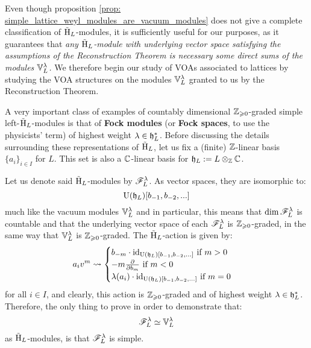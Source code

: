             Even though proposition \ref{prop: simple_lattice_weyl_modules_are_vacuum_modules} does not give a complete classification of $\tilde{\mathrm{H}}_L$-modules, it is sufficiently useful for our purposes, as it guarantees that \textit{any $\tilde{\mathrm{H}}_L$-module with underlying vector space satisfying the assumptions of the Reconstruction Theorem is necessary some direct sums of the modules $\mathbb{V}_L^{\lambda}$.} We therefore begin our study of VOAs associated to lattices by studying the VOA structures on the modules $\mathbb{V}_L^{\lambda}$ granted to us by the Reconstruction Theorem. 
            \begin{example} \label{example: bosonic_fock_modules}
                A very important class of examples of countably dimensional $\mathbb{Z}_{\geqslant 0}$-graded simple left-$\tilde{\mathrm{H}}_L$-modules is that of \textbf{Fock modules} (or \textbf{Fock spaces}, to use the physicists' term) of highest weight $\lambda \in \mathfrak{h}_L^*$. Before discussing the details surrounding these representations of $\tilde{\mathrm{H}}_L$, let us fix a (finite) $\mathbb{Z}$-linear basis $\{a_i\}_{i \in I}$ for $L$. This set is also a $\mathbb{C}$-linear basis for $\h_L := L \tensor_{\Z} \bbC$.
                
                Let us denote said $\tilde{\mathrm{H}}_L$-modules by $\mathscr{F}_L^{\lambda}$. As vector spaces, they are isomorphic to:
                    $$\mathrm{U}(\mathfrak{h}_L)[b_{-1}, b_{-2}, ...]$$
                much like the vacuum modules $\mathbb{V}_L^{\lambda}$ and in particular, this means that $\dim \mathscr{F}_L^{\lambda}$ is countable and that the underlying vector space of each $\mathscr{F}_L^{\lambda}$ is $\mathbb{Z}_{\geqslant 0}$-graded, in the same way that $\mathbb{V}_L^{\lambda}$ is $\mathbb{Z}_{\geqslant 0}$-graded. The $\tilde{\mathrm{H}}_L$-action is given by:
                    $$
                        a_i v^m \leadsto
                        \begin{cases}
                            \text{$b_{-m} \cdot \mathrm{id}_{\mathrm{U}(\mathfrak{h}_L)[b_{-1}, b_{-2}, ...]}$ if $m > 0$}
                            \\
                            \text{$-m \frac{\partial}{\partial b_m}$ if $m < 0$}
                            \\
                            \text{$\lambda(a_i) \cdot \mathrm{id}_{\mathrm{U}(\mathfrak{h}_L)[b_{-1}, b_{-2}, ...]}$ if $m = 0$}
                        \end{cases}
                    $$
                for all $i \in I$, and clearly, this action is $\mathbb{Z}_{\geqslant 0}$-graded and of highest weight $\lambda \in \mathfrak{h}_L^*$. Therefore, the only thing to prove in order to demonstrate that:
                    $$\mathscr{F}_L^{\lambda} \simeq \mathbb{V}_L^{\lambda}$$
                as $\tilde{\mathrm{H}}_L$-modules, is that $\mathscr{F}_L^{\lambda}$ is simple.
            \end{example}

